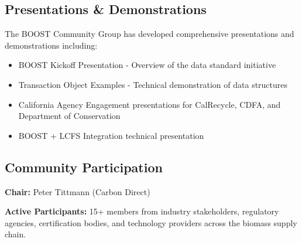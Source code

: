 
\subsection{Presentations \& Demonstrations}
\label{sec:presentations}

The BOOST Community Group has developed comprehensive presentations and demonstrations including:

\begin{itemize}
    \item BOOST Kickoff Presentation - Overview of the data standard initiative
    \item Transaction Object Examples - Technical demonstration of data structures
    \item California Agency Engagement presentations for CalRecycle, CDFA, and Department of Conservation
    \item BOOST + LCFS Integration technical presentation
\end{itemize}

\subsection{Community Participation}
\label{sec:community-participation}

\begin{informative}[title=BOOST Membership]
\textbf{Chair:} Peter Tittmann (Carbon Direct)

\textbf{Active Participants:} 15+ members from industry stakeholders, regulatory agencies, certification bodies, and technology providers across the biomass supply chain.
\end{informative}